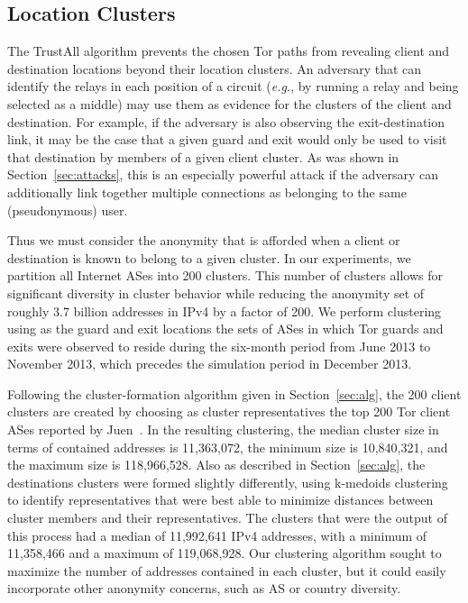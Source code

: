 \documentclass[conference]{styles/IEEEtran}
\newcommand{\eg}{\emph{e.g.}}
\begin{document}
\subsection{Location Clusters}
The TrustAll algorithm prevents the chosen Tor paths from revealing client and destination 
locations beyond their location clusters. An adversary that can identify the relays in each position
of a circuit (\eg{}, by running a relay and being selected as a middle) may use them as evidence for
the clusters of the client and destination. For example, if
the adversary is also observing the exit-destination link, it may be the case that a given guard
and exit would only be used to visit that destination by members of a given client cluster.
As was shown in Section~\ref{sec:attacks}, this is an especially powerful attack if the
adversary can additionally link together multiple connections as
belonging to the same (pseudonymous) user.

Thus we must consider the anonymity that is afforded when a client or destination is known to
belong to a given cluster. In our experiments, we partition all Internet ASes into 200 clusters.
This number of clusters allows for significant diversity in cluster behavior while reducing the
anonymity set of roughly 3.7 billion addresses in IPv4 by a factor of 200. We perform clustering
using as the guard and exit locations the sets of ASes in which Tor guards and exits were observed
to reside during the six-month
period from June 2013 to November 2013, which precedes the simulation period in December 2013. 

Following the cluster-formation algorithm given in Section~\ref{sec:alg}, the 200 client clusters
are created by choosing as cluster representatives the top 200 Tor client ASes reported by
Juen~\cite{juen-masters}. In the resulting clustering, the median cluster size
in terms of contained addresses is 11,363,072, the minimum size is 10,840,321, and the maximum
size is 118,966,528.
Also as described in Section~\ref{sec:alg}, the destinations clusters were formed slightly
differently, using k-medoids clustering to identify representatives that were best able to
minimize distances between cluster members and their representatives.
The clusters that were the output of
this process had a median of 11,992,641 IPv4 addresses, with a minimum of 11,358,466 and a
maximum of 119,068,928. Our clustering algorithm sought to maximize the number of addresses
contained in each cluster, but it could easily incorporate other anonymity concerns, such as
AS or country diversity.
\end{document}
